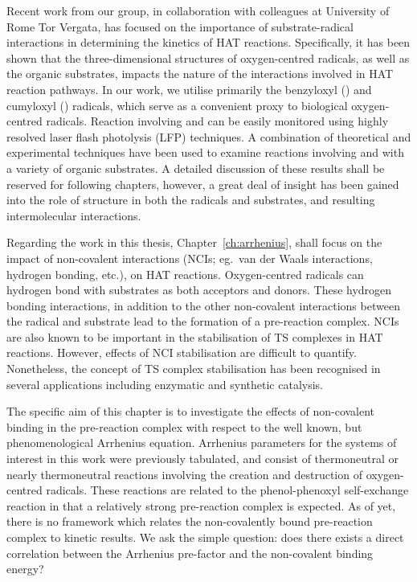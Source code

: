 {Recent work from our group, in collaboration with colleagues at University of Rome Tor Vergata, has focused on the importance of substrate-radical interactions in determining the kinetics of HAT reactions. Specifically, it has been shown that the three-dimensional structures of oxygen-centred radicals, as well as the organic substrates, impacts the nature of the interactions involved in HAT reaction pathways.\cite{Salamone2015Rev} In our work, we utilise primarily the benzyloxyl (\bno) and cumyloxyl (\cumo) radicals, which serve as a convenient proxy to biological oxygen-centred radicals. Reaction involving \bno and \cumo can be easily monitored using highly resolved laser flash photolysis (LFP) techniques. A combination of theoretical and experimental techniques have been used to examine reactions involving \bno and \cumo with a variety of organic substrates. A detailed discussion of these results shall be reserved for following chapters, however, a great deal of insight has been gained into the role of structure in both the radicals and substrates, and resulting intermolecular interactions.

Regarding the work in this thesis, Chapter~\ref{ch:arrhenius}, shall focus on the impact of non-covalent interactions (NCIs; eg.\ van der Waals interactions, hydrogen bonding, etc.), on HAT reactions. Oxygen-centred radicals can hydrogen bond with substrates as both acceptors and donors.\cite{Johnson2009a} These hydrogen bonding interactions, in addition to the other non-covalent interactions between the radical and substrate lead to the formation of a pre-reaction complex. NCIs are also known to be important in the stabilisation of TS complexes in HAT reactions.\cite{DiLabio2005, DiLabio2007} However, effects of NCI stabilisation are difficult to quantify. Nonetheless, the concept of TS complex stabilisation has been recognised in several applications including enzymatic\cite{Uyeda2011} and synthetic catalysis.\cite{Bakr2016}

The specific aim of this chapter is to investigate the effects of non-covalent binding in the pre-reaction complex with respect to the well known, but phenomenological Arrhenius equation. Arrhenius parameters for the systems of interest in this work were previously tabulated,\cite{DiLabio2005} and consist of thermoneutral or nearly thermoneutral reactions involving the creation and destruction of oxygen-centred radicals. These reactions are related to the phenol-phenoxyl self-exchange reaction in that a relatively strong pre-reaction complex is expected. As of yet, there is no framework which relates the non-covalently bound pre-reaction complex to kinetic results. We ask the simple question: does there exists a direct correlation between the Arrhenius pre-factor and the non-covalent binding energy?

}
